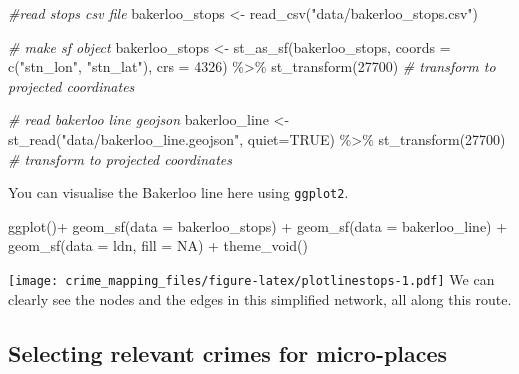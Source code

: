\documentclass[
  krantz2]{krantz}
\makeatletter
\newenvironment{Shaded}{\begin{snugshade}}{\end{snugshade}}
\newcommand{\AttributeTok}[1]{\textcolor[rgb]{0.61,0.61,0.61}{#1}}
\newcommand{\CommentTok}[1]{\textcolor[rgb]{0.37,0.37,0.37}{\textit{#1}}}
\newcommand{\ConstantTok}[1]{\textcolor[rgb]{0,0,0}{#1}}
\newcommand{\DecValTok}[1]{\textcolor[rgb]{0.06,0.06,0.06}{#1}}
\newcommand{\FunctionTok}[1]{\textcolor[rgb]{0,0,0}{#1}}
\newcommand{\NormalTok}[1]{#1}
\newcommand{\OtherTok}[1]{\textcolor[rgb]{0.37,0.37,0.37}{#1}}
\newcommand{\SpecialCharTok}[1]{\textcolor[rgb]{0,0,0}{#1}}
\newcommand{\StringTok}[1]{\textcolor[rgb]{0.5,0.5,0.5}{#1}}
\newenvironment{kframe}{%
\medskip{}
\setlength{\fboxsep}{.8em}
 \def\at@end@of@kframe{}%
 \ifinner\ifhmode%
  \def\at@end@of@kframe{\end{minipage}}%
  \begin{minipage}{\columnwidth}%
 \fi\fi%
 \def\FrameCommand##1{\hskip\@totalleftmargin \hskip-\fboxsep
 \colorbox{shadecolor}{##1}\hskip-\fboxsep
     \hskip-\linewidth \hskip-\@totalleftmargin \hskip\columnwidth}%
 \MakeFramed {\advance\hsize-\width
   \@totalleftmargin\z@ \linewidth\hsize
   \@setminipage}}%
 {\par\unskip\endMakeFramed%
 \at@end@of@kframe}
\renewenvironment{Shaded}{\begin{kframe}}{\end{kframe}}
\makeatother
\begin{document}
\begin{Shaded}
\begin{Highlighting}[]
\CommentTok{\#read stops csv file}
\NormalTok{bakerloo\_stops }\OtherTok{\textless{}{-}} \FunctionTok{read\_csv}\NormalTok{(}\StringTok{"data/bakerloo\_stops.csv"}\NormalTok{)}

\CommentTok{\# make sf object}
\NormalTok{bakerloo\_stops }\OtherTok{\textless{}{-}} \FunctionTok{st\_as\_sf}\NormalTok{(bakerloo\_stops, }
                           \AttributeTok{coords =} \FunctionTok{c}\NormalTok{(}\StringTok{"stn\_lon"}\NormalTok{, }\StringTok{"stn\_lat"}\NormalTok{), }
                           \AttributeTok{crs =} \DecValTok{4326}\NormalTok{) }\SpecialCharTok{\%\textgreater{}\%} 
  \FunctionTok{st\_transform}\NormalTok{(}\DecValTok{27700}\NormalTok{) }\CommentTok{\# transform to projected coordinates}

\CommentTok{\# read bakerloo line geojson}
\NormalTok{bakerloo\_line }\OtherTok{\textless{}{-}} \FunctionTok{st\_read}\NormalTok{(}\StringTok{"data/bakerloo\_line.geojson"}\NormalTok{, }
                         \AttributeTok{quiet=}\ConstantTok{TRUE}\NormalTok{) }\SpecialCharTok{\%\textgreater{}\%} 
  \FunctionTok{st\_transform}\NormalTok{(}\DecValTok{27700}\NormalTok{) }\CommentTok{\# transform to projected coordinates}
\end{Highlighting}
\end{Shaded}

You can visualise the Bakerloo line here using \texttt{ggplot2}.

\begin{Shaded}
\begin{Highlighting}[]
\FunctionTok{ggplot}\NormalTok{()}\SpecialCharTok{+} 
  \FunctionTok{geom\_sf}\NormalTok{(}\AttributeTok{data =}\NormalTok{ bakerloo\_stops) }\SpecialCharTok{+} 
  \FunctionTok{geom\_sf}\NormalTok{(}\AttributeTok{data =}\NormalTok{ bakerloo\_line) }\SpecialCharTok{+} 
  \FunctionTok{geom\_sf}\NormalTok{(}\AttributeTok{data =}\NormalTok{ ldn, }\AttributeTok{fill =} \ConstantTok{NA}\NormalTok{) }\SpecialCharTok{+} 
  \FunctionTok{theme\_void}\NormalTok{() }
\end{Highlighting}
\end{Shaded}

\texttt{[image: crime\_mapping\_files/figure-latex/plotlinestops-1.pdf]}
We can clearly see the nodes and the edges in this simplified network, all along this route.

\hypertarget{selecting-relevant-crimes-for-micro-places}{%
\subsection{Selecting relevant crimes for micro-places}\label{selecting-relevant-crimes-for-micro-places}}
\end{document}
